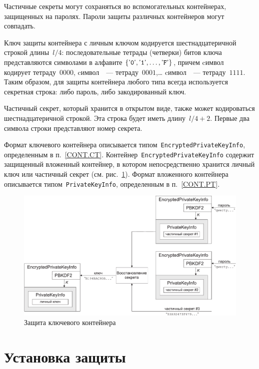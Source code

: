 Частичные секреты могут сохраняться во вспомогательных контейнерах, 
защищенных на паролях. Пароли защиты различных контейнеров могут совпадать.

Ключ защиты контейнера с личным ключом кодируется шестнадцатеричной строкой
длины~$l/4$: последовательные тетрады (четверки) битов ключа 
представляются символами в алфавите $\{\texttt{\textsf{'}0\textsf{'}},\texttt{\textsf{'}1\textsf{'}},\ldots,\texttt{\textsf{'}F\textsf{'}}\}$, 
причем cимвол~ кодирует тетраду~$0000$, 
cимвол~~--- тетраду~$0001$,\ldots
cимвол~~--- тетраду~$1111$.
%
Таким образом, для защиты контейнера любого типа всегда используется 
секретная строка: либо пароль, либо закодированный ключ.

Частичный секрет, который хранится в открытом виде, также может 
кодироваться шестнадцатеричной строкой. Эта строка будет иметь длину~$l/4+2$.
Первые два символа строки представляют номер секрета.

Формат ключевого контейнера описывается 
типом~\texttt{EncryptedPrivateKeyInfo}, определенным в п.~\ref{CONT.CT}.
Контейнер~\texttt{EncryptedPrivateKeyInfo} содержит защищенный вложенный
контейнер, в котором непосредственно хранится личный ключ или частичный 
секрет (см. рис.~\ref{Fig.CONT.1}). Формат вложенного контейнера 
описывается типом~\texttt{PrivateKeyInfo}, определенным в 
п.~\ref{CONT.PT}. 

\begin{figure}[hbt]
\begin{center}
\includegraphics[width=15cm]{../figs/cont}
\end{center}
\caption{Защита ключевого контейнера}
\label{Fig.CONT.1}
\end{figure}

\section{Установка защиты}\label{CONT.Wrap}

